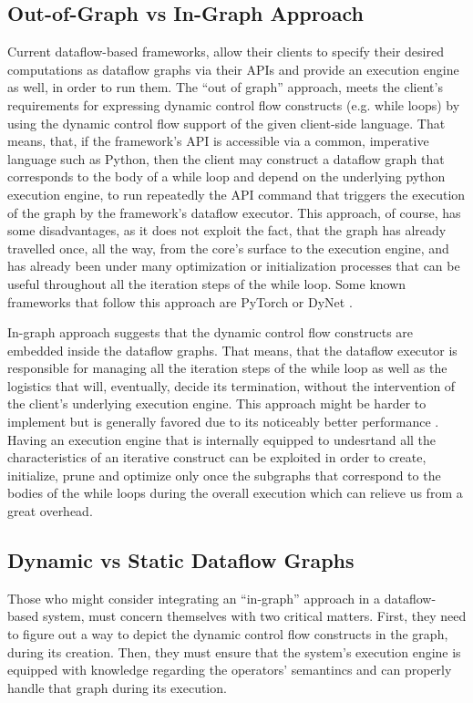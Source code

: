 \documentclass[ack,preface]{dithesis}
\begin{document}
    \subsection{Out-of-Graph vs In-Graph Approach}
Current dataflow-based frameworks, allow their clients to specify their desired computations as dataflow graphs via their APIs and provide an execution engine as well, in order to run them. The “out of graph” approach, meets the client’s requirements for expressing dynamic control flow constructs (e.g. while loops) by using the dynamic control flow support of the given client-side language. That means, that, if the framework’s API is accessible via a common, imperative language such as Python, then the client may construct a dataflow graph that corresponds to the body of a while loop and depend on the underlying python execution engine, to run repeatedly the API command that triggers the execution of the graph by the framework’s dataflow executor. This approach, of course, has some disadvantages, as it does not exploit the fact, that the graph has already travelled once, all the way, from the core’s surface to the execution engine, and has already been under many optimization or initialization processes that can be useful throughout all the iteration steps of the while loop.
Some known frameworks that follow this approach are  PyTorch \cite{Paszke2017} or DyNet  \cite{ Neubig2017DyNetTD}.

In-graph approach suggests that the dynamic control flow constructs are embedded inside the dataflow graphs. That means, that the dataflow executor is responsible for managing all the iteration steps of the while loop as well as the logistics that will, eventually, decide its termination, without the intervention of the client’s underlying execution engine.
This approach might be harder to implement but is generally favored due to its noticeably better performance \cite{Yu:2018}. Having an execution engine that is internally equipped to undesrtand all the characteristics of an iterative construct can be exploited in order to create, initialize, prune and optimize only once the subgraphs that correspond to the bodies of  the while loops during the overall execution which can relieve us from a great overhead.

    \subsection{Dynamic vs Static Dataflow Graphs}
Those who might consider integrating an “in-graph” approach in a dataflow-based system, must concern themselves with two critical matters. First, they need to figure out a way to depict the dynamic control flow constructs in the graph, during its creation. Then, they must ensure that  the system’s execution engine is equipped with knowledge regarding the operators' semantincs  and can properly handle that graph during its execution.
\end{document}
